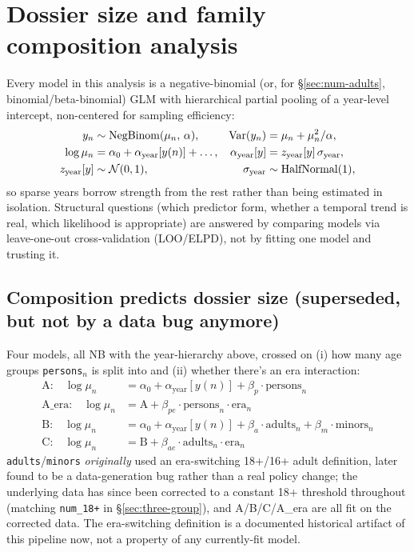 \section{Dossier size and family composition analysis}

Every model in this analysis is a negative-binomial (or, for \S\ref{sec:num-adults},
binomial/beta-binomial) GLM with hierarchical partial pooling of a year-level
intercept, non-centered for sampling efficiency:
\begin{align}
  y_n &\sim \mathrm{NegBinom}(\mu_n,\, \alpha), &
  \mathrm{Var}(y_n) &= \mu_n + \mu_n^2/\alpha, \\
  \log \mu_n &= \alpha_0 + \alpha_{\text{year}}[y(n)] + \dots, &
  \alpha_{\text{year}}[y] &= z_{\text{year}}[y]\, \sigma_{\text{year}}, \\
  z_{\text{year}}[y] &\sim \mathcal{N}(0,1), &
  \sigma_{\text{year}} &\sim \mathrm{HalfNormal}(1),
\end{align}
so sparse years borrow strength from the rest rather than being estimated in
isolation. Structural questions (which predictor form, whether a temporal
trend is real, which likelihood is appropriate) are answered by comparing
models via leave-one-out cross-validation (LOO/ELPD), not by fitting one
model and trusting it.

\subsection{Composition predicts dossier size (superseded, but not by a data bug anymore)}
\label{sec:size-ab}

Four models, all NB with the year-hierarchy above, crossed on (i) how many
age groups \texttt{persons}$_n$ is split into and (ii) whether there's an
era interaction:
\begin{align}
  \text{A:}\quad \log\mu_n &= \alpha_0 + \alpha_{\text{year}}[y(n)] + \beta_p \cdot \text{persons}_n \\
  \text{A\_era:}\quad \log\mu_n &= \text{A} + \beta_{pe} \cdot \text{persons}_n \cdot \text{era}_n \\
  \text{B:}\quad \log\mu_n &= \alpha_0 + \alpha_{\text{year}}[y(n)] + \beta_a \cdot \text{adults}_n + \beta_m \cdot \text{minors}_n \\
  \text{C:}\quad \log\mu_n &= \text{B} + \beta_{ae} \cdot \text{adults}_n \cdot \text{era}_n
\end{align}
\texttt{adults}/\texttt{minors} \emph{originally} used an era-switching
18+/16+ adult definition, later found to be a data-generation bug rather
than a real policy change; the underlying data has since been corrected to
a constant 18+ threshold throughout (matching \texttt{num\_18+} in
\S\ref{sec:three-group}), and A/B/C/A\_era are all fit on the corrected
data. The era-switching definition is a documented historical artifact of
this pipeline now, not a property of any currently-fit model.

